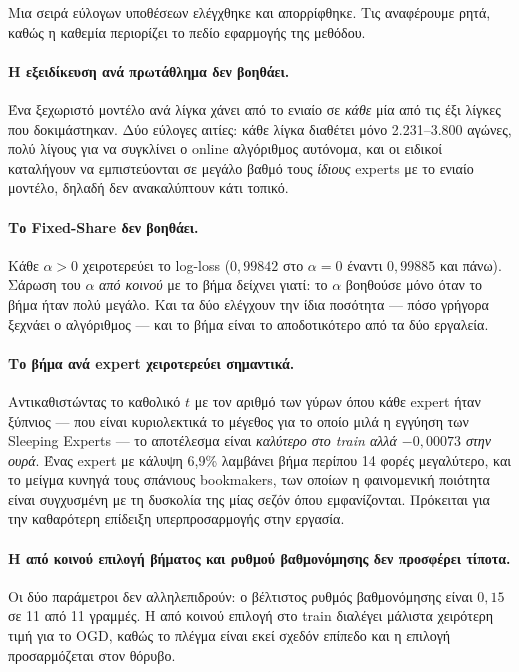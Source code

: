 \documentclass[12pt,a4paper,oneside]{report}
\renewcommand{\_}{\oldunderscore\allowbreak}
\theoremstyle{definition}
\theoremstyle{plain}
\theoremstyle{remark}
\begin{document}
Μια σειρά εύλογων υποθέσεων ελέγχθηκε και απορρίφθηκε. Τις αναφέρουμε ρητά, καθώς η καθεμία
περιορίζει το πεδίο εφαρμογής της μεθόδου.

\paragraph{Η εξειδίκευση ανά πρωτάθλημα δεν βοηθάει.} Ένα ξεχωριστό μοντέλο ανά λίγκα χάνει
από το ενιαίο σε \emph{κάθε} μία από τις έξι λίγκες που δοκιμάστηκαν. Δύο εύλογες αιτίες:
κάθε λίγκα διαθέτει μόνο 2.231--3.800 αγώνες, πολύ λίγους για να συγκλίνει ο online
αλγόριθμος αυτόνομα, και οι ειδικοί καταλήγουν να εμπιστεύονται σε μεγάλο βαθμό τους
\emph{ίδιους} experts με το ενιαίο μοντέλο, δηλαδή δεν ανακαλύπτουν κάτι τοπικό.

\paragraph{Το Fixed-Share δεν βοηθάει.} Κάθε $\alpha > 0$ χειροτερεύει το log-loss
($0{,}99842$ στο $\alpha=0$ έναντι $0{,}99885$ και πάνω). Σάρωση του $\alpha$ \emph{από
κοινού} με το βήμα δείχνει γιατί: το $\alpha$ βοηθούσε μόνο όταν το βήμα ήταν πολύ μεγάλο.
Και τα δύο ελέγχουν την ίδια ποσότητα --- πόσο γρήγορα ξεχνάει ο αλγόριθμος --- και το βήμα
είναι το αποδοτικότερο από τα δύο εργαλεία.

\paragraph{Το βήμα ανά expert χειροτερεύει σημαντικά.} Αντικαθιστώντας το καθολικό $t$ με τον
αριθμό των γύρων όπου κάθε expert ήταν ξύπνιος --- που είναι κυριολεκτικά το μέγεθος για το
οποίο μιλά η εγγύηση των Sleeping Experts --- το αποτέλεσμα είναι \emph{καλύτερο στο train
αλλά $-0{,}00073$ στην ουρά}. Ένας expert με κάλυψη 6,9\% λαμβάνει βήμα περίπου 14 φορές
μεγαλύτερο, και το μείγμα κυνηγά τους σπάνιους bookmakers, των οποίων η φαινομενική ποιότητα
είναι συγχυσμένη με τη δυσκολία της μίας σεζόν όπου εμφανίζονται. Πρόκειται για την
καθαρότερη επίδειξη υπερπροσαρμογής στην εργασία.

\paragraph{Η από κοινού επιλογή βήματος και ρυθμού βαθμονόμησης δεν προσφέρει τίποτα.} Οι
δύο παράμετροι δεν αλληλεπιδρούν: ο βέλτιστος ρυθμός βαθμονόμησης είναι $0{,}15$ σε 11 από
11 γραμμές. Η από κοινού επιλογή στο train διαλέγει μάλιστα χειρότερη τιμή για το OGD, καθώς
το πλέγμα είναι εκεί σχεδόν επίπεδο και η επιλογή προσαρμόζεται στον θόρυβο.
\end{document}
